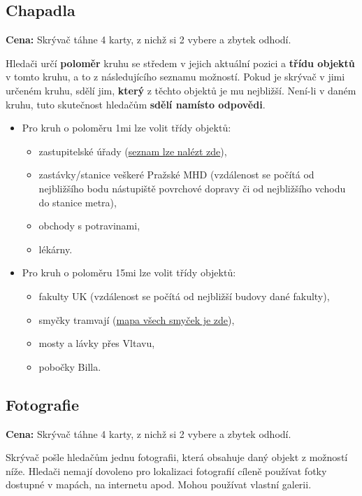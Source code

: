 \subsection{Chapadla}

\textbf{Cena:} Skrývač táhne 4 karty, z nichž si 2 vybere a zbytek odhodí.

Hledači určí \textbf{poloměr} kruhu se středem v jejich aktuální pozici a \textbf{třídu objektů} v tomto kruhu, a to z následujícího seznamu možností. Pokud je skrývač v jimi určeném kruhu, sdělí jim, \textbf{který} z těchto objektů je mu nejbližší. Není-li v daném kruhu, tuto skutečnost hledačům \textbf{sdělí namísto odpovědi}.

\begin{itemize}
	\item Pro kruh o poloměru \dist1mi lze volit třídy objektů:
	\begin{itemize}
		\item zastupitelské úřady (\href{https://cs.wikipedia.org/wiki/Seznam_zastupitelsk\%C3\%BDch_\%C3\%BA\%C5\%99ad\%C5\%AF_v_\%C4\%8Cesk\%C3\%A9_republice}{seznam lze nalézt zde}),
		\item zastávky/stanice veškeré Pražské MHD (vzdálenost se počítá od nejbližšího bodu nástupiště povrchové dopravy či od nejbližšího vchodu do stanice metra),
		\item obchody s potravinami,
		\item lékárny.
	\end{itemize}
	\item Pro kruh o poloměru \dist15mi lze volit třídy objektů:
	\begin{itemize}
		\item fakulty UK (vzdálenost se počítá od nejbližší budovy dané fakulty),
		\item smyčky tramvají (\href{https://mapy.com/s/fobosuzuzu}{mapa všech smyček je zde}),
		\item mosty a lávky přes Vltavu,
		\item pobočky Billa.
	\end{itemize}
\end{itemize}

\subsection{Fotografie}

\textbf{Cena:} Skrývač táhne 4 karty, z nichž si 2 vybere a zbytek odhodí.

Skrývač pošle hledačům jednu fotografii, která obsahuje daný objekt z možností níže. Hledači nemají dovoleno pro lokalizaci fotografií cíleně používat fotky dostupné v mapách, na internetu apod. Mohou používat vlastní galerii.

